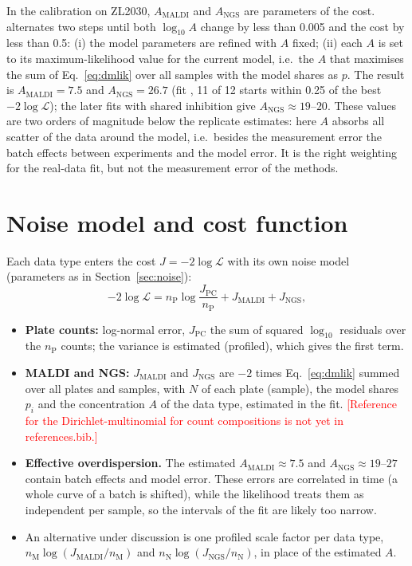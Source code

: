 \documentclass[11pt,a4paper]{article}
\newcommand{\todo}[1]{\textcolor{red}{[#1]}}
\begin{document}
In the calibration on ZL2030, $A_{\mathrm{MALDI}}$ and $A_{\mathrm{NGS}}$ are parameters of the cost.  alternates two steps until both $\log_{10} A$ change by less than 0.005 and the cost by less than 0.5: (i) the model parameters are refined with $A$ fixed; (ii) each $A$ is set to its maximum-likelihood value for the current model, i.e.\ the $A$ that maximises the sum of Eq.~\eqref{eq:dmlik} over all samples with the model shares as $p$. The result is $A_{\mathrm{MALDI}} = 7.5$ and $A_{\mathrm{NGS}} = 26.7$ (fit , 11 of 12 starts within 0.25 of the best $-2\log\mathcal{L}$); the later fits with shared inhibition give $A_{\mathrm{NGS}} \approx 19$--$20$. These values are two orders of magnitude below the replicate estimates: here $A$ absorbs all scatter of the data around the model, i.e.\ besides the measurement error the batch effects between experiments and the model error. It is the right weighting for the real-data fit, but not the measurement error of the methods.

\section{Noise model and cost function}

Each data type enters the cost $J = -2\log\mathcal{L}$ with its own noise model (parameters as in Section~\ref{sec:noise}):
\begin{equation*}
-2\log\mathcal{L} = n_{\mathrm{P}} \log\frac{J_{\mathrm{PC}}}{n_{\mathrm{P}}} + J_{\mathrm{MALDI}} + J_{\mathrm{NGS}},
\end{equation*}
\begin{itemize}
\item \textbf{Plate counts:} log-normal error, $J_{\mathrm{PC}}$ the sum of squared $\log_{10}$ residuals over the $n_{\mathrm{P}}$ counts; the variance is estimated (profiled), which gives the first term.
\item \textbf{MALDI and NGS:} $J_{\mathrm{MALDI}}$ and $J_{\mathrm{NGS}}$ are $-2$ times Eq.~\eqref{eq:dmlik} summed over all plates and samples, with $N$ of each plate (sample), the model shares $p_i$ and the concentration $A$ of the data type, estimated in the fit. \todo{Reference for the Dirichlet-multinomial for count compositions is not yet in references.bib.}
\item \textbf{Effective overdispersion.} The estimated $A_{\mathrm{MALDI}} \approx 7.5$ and $A_{\mathrm{NGS}} \approx 19$--$27$ contain batch effects and model error. These errors are correlated in time (a whole curve of a batch is shifted), while the likelihood treats them as independent per sample, so the intervals of the fit are likely too narrow.
\item An alternative under discussion is one profiled scale factor per data type, $n_{\mathrm{M}}\log(J_{\mathrm{MALDI}}/n_{\mathrm{M}})$ and $n_{\mathrm{N}}\log(J_{\mathrm{NGS}}/n_{\mathrm{N}})$, in place of the estimated $A$.
\end{itemize}
\end{document}
